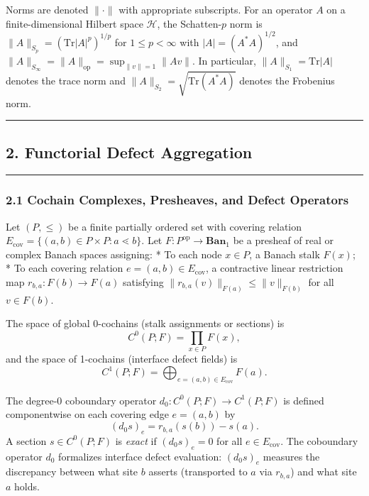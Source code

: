 \documentclass[
]{article}
\begin{document}
Norms are denoted \(\|\cdot\|\) with appropriate subscripts. For an operator \(A\) on a finite-dimensional Hilbert space \(\mathcal{H}\), the Schatten-\(p\) norm is \(\|A\|_{S_p} = (\mathrm{Tr}|A|^p)^{1/p}\) for \(1 \le p < \infty\) with \(|A| = (A^* A)^{1/2}\), and \(\|A\|_{S_\infty} = \|A\|_{\mathrm{op}} = \sup_{\|v\|=1} \|Av\|\). In particular, \(\|A\|_{S_1} = \mathrm{Tr}|A|\) denotes the trace norm and \(\|A\|_{S_2} = \sqrt{\mathrm{Tr}(A^* A)}\) denotes the Frobenius norm.

\begin{center}\rule{0.5\linewidth}{0.5pt}\end{center}

\subsection{2. Functorial Defect Aggregation}\label{functorial-defect-aggregation}

\begin{center}\rule{0.5\linewidth}{0.5pt}\end{center}

\subsubsection{2.1 Cochain Complexes, Presheaves, and Defect Operators}\label{cochain-complexes-presheaves-and-defect-operators}

Let \((P, \le)\) be a finite partially ordered set with covering relation \(E_{\mathrm{cov}} = \{(a, b) \in P \times P : a \lessdot b\}\). Let \(F: P^{\mathrm{op}} \to \mathbf{Ban}_1\) be a presheaf of real or complex Banach spaces assigning:
* To each node \(x \in P\), a Banach stalk \(F(x)\);
* To each covering relation \(e = (a, b) \in E_{\mathrm{cov}}\), a contractive linear restriction map \(r_{b,a}: F(b) \to F(a)\) satisfying \(\|r_{b,a}(v)\|_{F(a)} \le \|v\|_{F(b)}\) for all \(v \in F(b)\).

The space of global 0-cochains (stalk assignments or sections) is
\[C^0(P; F) = \prod_{x \in P} F(x),\]
and the space of 1-cochains (interface defect fields) is
\[C^1(P; F) = \bigoplus_{e=(a,b) \in E_{\mathrm{cov}}} F(a).\]

The degree-0 coboundary operator \(d_0: C^0(P; F) \to C^1(P; F)\) is defined componentwise on each covering edge \(e = (a, b)\) by
\[(d_0 s)_e = r_{b,a}(s(b)) - s(a).\]
A section \(s \in C^0(P; F)\) is \emph{exact} if \((d_0 s)_e = 0\) for all \(e \in E_{\mathrm{cov}}\). The coboundary operator \(d_0\) formalizes interface defect evaluation: \((d_0 s)_e\) measures the discrepancy between what site \(b\) asserts (transported to \(a\) via \(r_{b,a}\)) and what site \(a\) holds.
\end{document}
